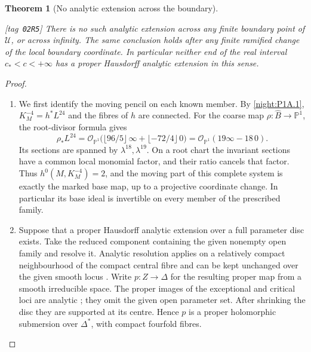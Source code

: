 \documentclass[11pt,a4paper]{article}
\numberwithin{equation}{section}
\newtheorem{theorem}{Theorem}[section]
\theoremstyle{definition}
\newcommand{\StatementRecord}[4]{{\upshape\footnotesize[tag~\texttt{#3}]}\enspace\ignorespaces}
\begin{document}
\begin{theorem}[No analytic extension across the boundary]\hypertarget{tag-02R5}{}\label{night:P1A.5}
\StatementRecord{night:P1A.5}{proved}{02R5}{\cref{night:P1A.1}, \cref{night:P1.8}, \cref{night:P1.18}, \cref{rem:V:conjugation-parameter}; \cite[Theorem 1.6, preprint p.~5]{BM97}; \cite[\S6, Hauptsatz I; \S7, Satz 1 and Satz 5]{Grauert60}}
There is no such analytic extension across any finite boundary
point of $\mathcal U$, or across infinity. The same conclusion
holds after any finite ramified change of the local boundary
coordinate. In particular neither end of the real interval
$c_*<c<+\infty$ has a proper Hausdorff analytic extension in
this sense.
\end{theorem}
\begin{proof}
\begin{enumerate}[label=\arabic*.]
\item We first identify the moving pencil on each known member.
By \cref{night:P1A.1}, $K_M^{-4}=h^*L^{24}$ and the fibres of $h$
are connected.  For the coarse map
$\rho:\widehat B\to\mathbb P^1$, the root-divisor formula gives
\[
 \rho_*L^{24}
 =\mathcal O_{\mathbb P^1}
   \bigl(\lfloor96/5\rfloor\,\infty+
                \lfloor-72/4\rfloor\,0\bigr)
 =\mathcal O_{\mathbb P^1}(19\infty-18\,0).
\]
Its sections are spanned by $\lambda^{18},\lambda^{19}$.
On a root chart the invariant sections have a common local
monomial factor, and their ratio cancels that factor.  Thus
$h^0(M,K_M^{-4})=2$, and the moving part of this complete
system is exactly the marked base map, up to a projective
coordinate change.  In particular its base ideal is invertible
on every member of the prescribed family.

\item Suppose that a proper Hausdorff analytic extension over a full
parameter disc exists.  Take the reduced component containing
the given nonempty open family and resolve it.  Analytic
resolution applies on a relatively compact neighbourhood of
the compact central fibre and can be kept unchanged over the
given smooth locus
\cite[Theorem 1.6 and its following analytic-neighbourhood
paragraph, preprint p.~5]{BM97}.
Write $p:Z\to\Delta$ for the resulting proper map from a smooth
irreducible space.  The proper images of the exceptional and
critical loci are analytic
\cite[\S7, Satz 1, p.~60]{Grauert60}; they omit the given open
parameter set.  After shrinking the disc they are supported
at its centre.  Hence $p$ is a proper holomorphic submersion
over $\Delta^*$, with compact fourfold fibres.


\end{enumerate}
\end{proof}
\end{document}
